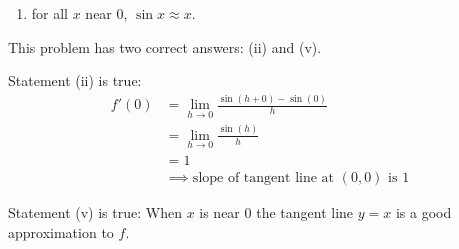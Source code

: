 \documentclass[nooutcomes]{ximera}
\begin{document}
\begin{problem}
\begin{enumerate}
\begin{enumerate}
        \item
          for all $x$ near $0$, $\sin x \approx x$.
      \end{enumerate}
      \begin{freeResponse}
        This problem has two correct answers: (ii) and (v).

        Statement (ii) is true:
        \begin{align*}
          f'(0) &= \lim_{h \to 0} \frac{\sin (h + 0) - \sin (0)}{h} \\
                &= \lim_{h \to 0} \frac{\sin (h)}{h} \\
                &= 1\\
          &\implies \mbox{slope of tangent line at $(0,0)$ is $1$}
        \end{align*}

        Statement (v) is true:
        When $x$ is near $0$ the tangent line $y = x$ is a good approximation to $f$.
      \end{freeResponse}

  \end{enumerate}

	
\end{problem}	
	
\end{document}
